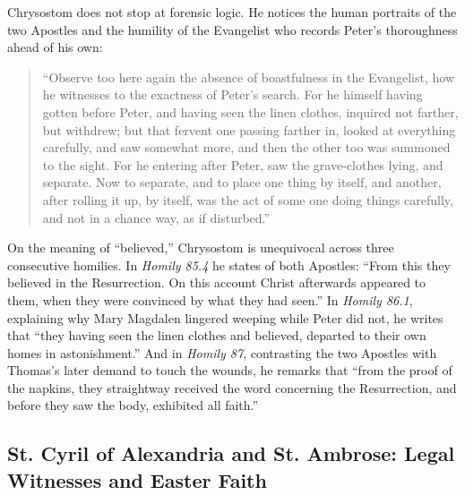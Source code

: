 Chrysostom does not stop at forensic logic. He notices the human portraits of the two Apostles and the humility of the Evangelist who records Peter's thoroughness ahead of his own:
\begin{quote}
``Observe too here again the absence of boastfulness in the Evangelist, how he witnesses to the exactness of Peter's search. For he himself having gotten before Peter, and having seen the linen clothes, inquired not farther, but withdrew; but that fervent one passing farther in, looked at everything carefully, and saw somewhat more, and then the other too was summoned to the sight. For he entering after Peter, saw the grave-clothes lying, and separate. Now to separate, and to place one thing by itself, and another, after rolling it up, by itself, was the act of some one doing things carefully, and not in a chance way, as if disturbed.''
\end{quote}

On the meaning of ``believed,'' Chrysostom is unequivocal across three consecutive homilies. In \emph{Homily 85.4} he states of both Apostles: ``From this they believed in the Resurrection. On this account Christ afterwards appeared to them, when they were convinced by what they had seen.'' In \emph{Homily 86.1}, explaining why Mary Magdalen lingered weeping while Peter did not, he writes that ``they having seen the linen clothes and believed, departed to their own homes in astonishment.'' And in \emph{Homily 87}, contrasting the two Apostles with Thomas's later demand to touch the wounds, he remarks that ``from the proof of the napkins, they straightway received the word concerning the Resurrection, and before they saw the body, exhibited all faith.''

\subsection{St. Cyril of Alexandria and St. Ambrose: Legal Witnesses and Easter Faith}

